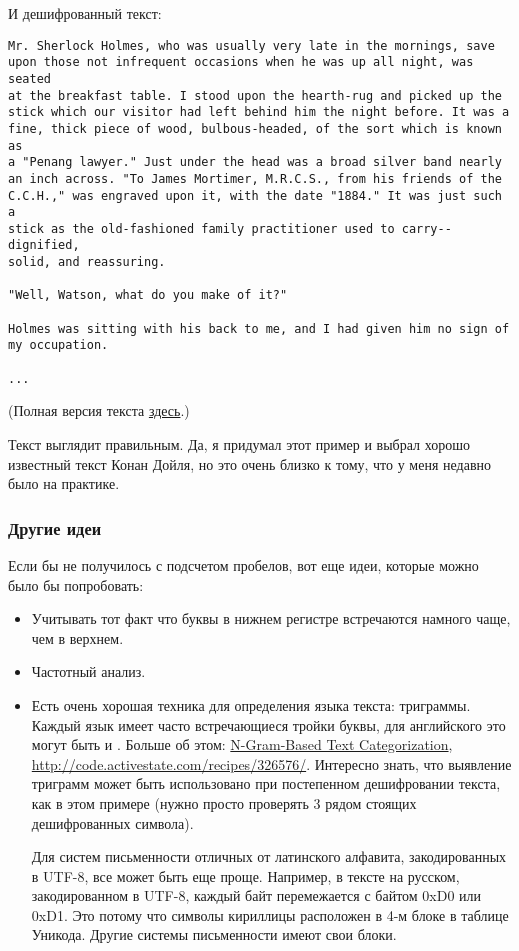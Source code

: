 И дешифрованный текст:

\begin{lstlisting}
Mr. Sherlock Holmes, who was usually very late in the mornings, save
upon those not infrequent occasions when he was up all night, was seated
at the breakfast table. I stood upon the hearth-rug and picked up the
stick which our visitor had left behind him the night before. It was a
fine, thick piece of wood, bulbous-headed, of the sort which is known as
a "Penang lawyer." Just under the head was a broad silver band nearly
an inch across. "To James Mortimer, M.R.C.S., from his friends of the
C.C.H.," was engraved upon it, with the date "1884." It was just such a
stick as the old-fashioned family practitioner used to carry--dignified,
solid, and reassuring.

"Well, Watson, what do you make of it?"

Holmes was sitting with his back to me, and I had given him no sign of
my occupation.

...
\end{lstlisting}

(Полная версия текста \href{\GitHubBlobMasterURL/ff/XOR/mask_2/files/plain.txt}{здесь}.)

Текст выглядит правильным.
Да, я придумал этот пример и выбрал хорошо известный текст Конан Дойля, но это очень близко к тому,
что у меня недавно было на практике.

\subsubsection{Другие идеи}

Если бы не получилось с подсчетом пробелов, вот еще идеи, которые можно было бы попробовать:

\begin{itemize}

\item Учитывать тот факт что буквы в нижнем регистре встречаются намного чаще, чем в верхнем.

\item Частотный анализ.

\item Есть очень хорошая техника для определения языка текста: триграммы.
Каждый язык имеет часто встречающиеся тройки буквы, для английского это могут быть  и .
Больше об этом:
\href{http://odur.let.rug.nl/~vannoord/TextCat/textcat.pdf}{N-Gram-Based Text Categorization},
\url{http://code.activestate.com/recipes/326576/}.
Интересно знать, что выявление триграмм может быть использовано при постепенном дешифровании текста, как в этом примере
(нужно просто проверять 3 рядом стоящих дешифрованных символа).

Для систем письменности отличных от латинского алфавита, закодированных в UTF-8, все может быть еще проще.
Например, в тексте на русском, закодированном в UTF-8, каждый байт перемежается с байтом 0xD0 или 0xD1.
Это потому что символы кириллицы расположен в 4-м блоке в таблице Уникода.
Другие системы письменности имеют свои блоки.

\end{itemize}

